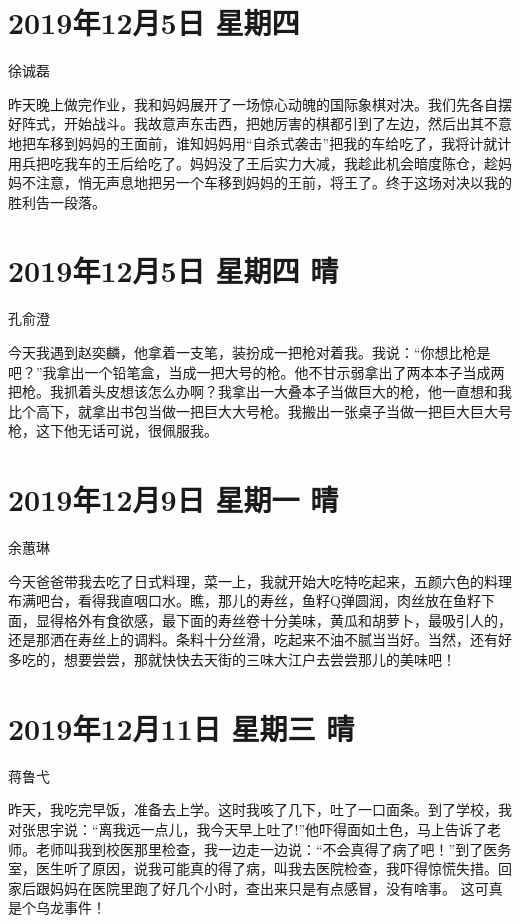 \section{2019年12月5日 星期四}

徐诚磊

昨天晚上做完作业，我和妈妈展开了一场惊心动魄的国际象棋对决。我们先各自摆好阵式，开始战斗。我故意声东击西，把她厉害的棋都引到了左边，然后出其不意地把车移到妈妈的王面前，谁知妈妈用``自杀式袭击''把我的车给吃了，我将计就计用兵把吃我车的王后给吃了。妈妈没了王后实力大减，我趁此机会暗度陈仓，趁妈妈不注意，悄无声息地把另一个车移到妈妈的王前，将王了。终于这场对决以我的胜利告一段落。

\section{2019年12月5日 星期四 晴}

孔俞澄

今天我遇到赵奕麟，他拿着一支笔，装扮成一把枪对着我。我说：``你想比枪是吧？''我拿出一个铅笔盒，当成一把大号的枪。他不甘示弱拿出了两本本子当成两把枪。我抓着头皮想该怎么办啊？我拿出一大叠本子当做巨大的枪，他一直想和我比个高下，就拿出书包当做一把巨大大号枪。我搬出一张桌子当做一把巨大巨大号枪，这下他无话可说，很佩服我。

\section{2019年12月9日 星期一 晴}

余蕙琳

今天爸爸带我去吃了日式料理，菜一上，我就开始大吃特吃起来，五颜六色的料理布满吧台，看得我直咽口水。瞧，那儿的寿丝，鱼籽Q弹圆润，肉丝放在鱼籽下面，显得格外有食欲感，最下面的寿丝卷十分美味，黄瓜和胡萝卜，最吸引人的，还是那洒在寿丝上的调料。条料十分丝滑，吃起来不油不腻当当好。当然，还有好多吃的，想要尝尝，那就快快去天街的三味大江户去尝尝那儿的美味吧！

\section{2019年12月11日 星期三 晴}

蒋鲁弋

昨天，我吃完早饭，准备去上学。这时我咳了几下，吐了一口面条。到了学校，我对张思宇说：``离我远一点儿，我今天早上吐了!''他吓得面如土色，马上告诉了老师。老师叫我到校医那里检查，我一边走一边说：``不会真得了病了吧！''到了医务室，医生听了原因，说我可能真的得了病，叫我去医院检查，我吓得惊慌失措。回家后跟妈妈在医院里跑了好几个小时，查出来只是有点感冒，没有啥事。
这可真是个乌龙事件！

